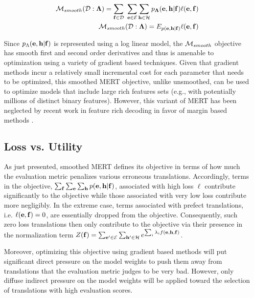 \documentclass[11pt]{article}
\begin{document}
\begin{equation}
\begin{split}
{\cal M}_{smooth}({\cal D} : {\bf \Lambda}) = \sum_{{\bf f} \in {\cal D}}^{}\ \sum_{{\bf e} \in {\cal E}} \sum_{{\bf h} \in {\cal H}} p_{\bf \Lambda} ({\bf e},  {\bf h} | {\bf f}) \ell({\bf e}, {\bf f}) \\
{\cal M}_{smooth}({\cal D} : {\bf \Lambda}) = E_{p({\bf e},{\bf h} | {\bf f})} \ell({\bf e}, {\bf f})
\end{split}
\label{smoothmert}
\end{equation}

Since $p_{\Lambda}({\bf e}, {\bf h} | {\bf f})$ is represented using a log linear model, the ${\cal M}_{smooth}$ objective has smooth first and second order derivatives and thus is amenable to optimization using a variety of gradient based techniques. Given that gradient methods incur a relatively small incremental cost for each parameter that needs to be optimized, this smoothed MERT objective, unlike unsmoothed, can be used to optimize models that include large rich features sets (e.g., with potentially millions of distinct binary features). However, this variant of MERT has been neglected by recent work in feature rich decoding in favor of margin based methods \cite{liang2006} \cite{tillmann2006} \cite{watanabe2007} \cite{arun2007}.

\subsection{Loss vs. Utility}

As just presented, smoothed MERT defines its objective in terms of how much the evaluation metric penalizes various erroneous translations. Accordingly, terms in the objective, $\sum_{\bf f} \sum_{\bf e} \sum_{\bf h} p({\bf e}, {\bf h} | {\bf f})$, associated with high loss $\ell$ contribute significantly to the objective while those associated with very low loss contribute more negligibly. In the extreme case, terms associated with prefect translations, i.e. $\ell({\bf e}, {\bf f})=0$, are essentially dropped from the objective. Consequently, such zero loss translations then only contribute to the objective via their presence in the normalization term $Z({\bf f}) = \sum_{{\bf e^\prime} \in {\cal E}} \sum_{{\bf h^\prime} \in {\cal H}} e^{\sum_i \lambda_i f({\bf e},{\bf h},{\bf f})}$.  

Moreover, optimizing this objective using gradient based methods will put significant direct pressure on the model weights to push them away from translations that the evaluation metric judges to be very bad. However, only diffuse indirect pressure on the model weights will be applied toward the selection of translations with high evaluation scores. 
\end{document}
